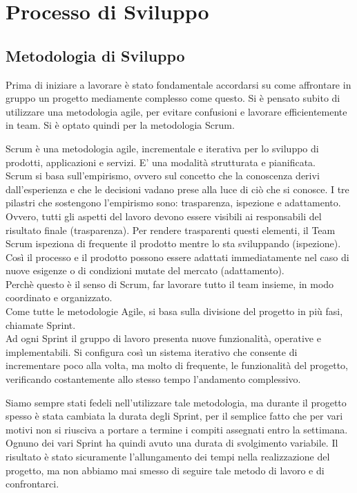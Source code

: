 \chapter{Processo di Sviluppo}


\section{Metodologia di Sviluppo}
Prima di iniziare a lavorare è stato fondamentale accordarsi su come affrontare in gruppo un progetto mediamente complesso come questo. Si è pensato subito di utilizzare una metodologia agile, per evitare confusioni e lavorare efficientemente in team. Si è optato quindi per la metodologia Scrum.\vspace{0.5cm}

    Scrum è una metodologia agile, incrementale e iterativa per lo sviluppo di prodotti, applicazioni e servizi. E' una modalità strutturata e pianificata.\\
    Scrum si basa sull’empirismo, ovvero sul concetto che la conoscenza derivi dall’esperienza e che le decisioni vadano prese alla luce di ciò che si conosce. I tre pilastri che sostengono l’empirismo sono: trasparenza, ispezione e adattamento.\\
    Ovvero, tutti gli aspetti del lavoro devono essere visibili ai responsabili del risultato finale (trasparenza). Per rendere trasparenti questi elementi, il Team Scrum ispeziona di frequente il prodotto mentre lo sta sviluppando (ispezione). Così il processo e il prodotto possono essere adattati immediatamente nel caso di nuove esigenze o di condizioni mutate del mercato (adattamento).\\ 
    Perchè questo è il senso di Scrum, far lavorare tutto il team insieme, in modo coordinato e organizzato.\\
    Come tutte le metodologie Agile, si basa sulla divisione del progetto in più fasi, chiamate Sprint.\\
Ad ogni Sprint il gruppo di lavoro presenta nuove funzionalità, operative e implementabili. Si configura così un sistema iterativo che consente di incrementare poco alla volta, ma molto di frequente, le funzionalità del progetto, verificando costantemente allo stesso tempo l'andamento complessivo.\vspace{0.5cm}

Siamo sempre stati fedeli nell'utilizzare tale metodologia, ma durante il progetto spesso è stata cambiata la durata degli Sprint, per il semplice fatto che per vari motivi non si riusciva a portare a termine i compiti assegnati entro la settimana. Ognuno dei vari Sprint ha quindi avuto una durata di svolgimento variabile. Il risultato è stato sicuramente l'allungamento dei tempi nella realizzazione del progetto, ma non abbiamo mai smesso di seguire tale metodo di lavoro e di confrontarci.


